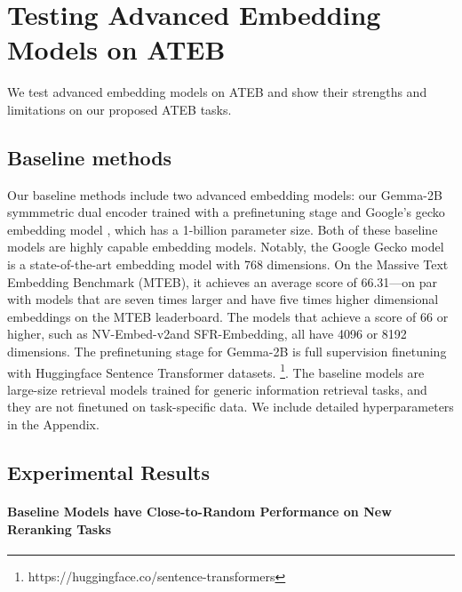 
\section{Testing Advanced Embedding Models on ATEB}
We test advanced embedding models on ATEB and show their strengths and limitations on our proposed ATEB tasks. 
\subsection{Baseline methods}
Our baseline methods include two advanced embedding models: our Gemma-2B symmmetric dual encoder trained with a prefinetuning stage and Google's gecko embedding model \citep{lee2024geckoversatiletextembeddings}, which has a 1-billion parameter size. Both of these baseline models are highly capable embedding models. Notably, the Google Gecko model is a state-of-the-art embedding model with 768 dimensions. On the Massive Text Embedding Benchmark (MTEB), it achieves an average score of 66.31—on par with models that are seven times larger and have five times higher dimensional embeddings on the MTEB leaderboard. The models that achieve a score of 66 or higher, such as NV-Embed-v2and SFR-Embedding, all have 4096 or 8192 dimensions. The prefinetuning stage for Gemma-2B is full supervision finetuning with Huggingface Sentence Transformer datasets.  \footnote{https://huggingface.co/sentence-transformers}. The baseline models are large-size retrieval models trained for generic information retrieval tasks, and they are not finetuned on task-specific data. We include detailed hyperparameters in the Appendix. 

\subsection{Experimental Results}
\paragraph{Baseline Models have Close-to-Random Performance on New Reranking Tasks}

